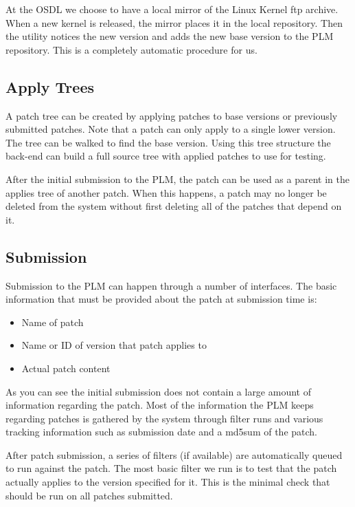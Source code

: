 At the OSDL we choose to have a local mirror of the Linux Kernel ftp archive.  
When a new kernel is released, the mirror places it in the local repository.  
Then the utility notices the new version and adds the new base version to 
the PLM repository.  This is a completely automatic procedure for us.

\subsection{Apply Trees}
A patch tree can be created by applying patches to base versions or previously
submitted patches.  Note that a patch can only apply to a single lower version.  
The tree can be walked to find the base version.  Using this tree structure the
back-end can build a full source tree with applied patches to use for testing.

After the initial submission to the PLM, the patch can be used as a parent
in the applies tree of another patch.  When this happens, a patch may no 
longer be deleted from the system without first deleting all of the patches 
that depend on it.

\subsection{Submission}
Submission to the PLM can happen through a number of interfaces.  The basic
information that must be provided about the patch at submission time is:

\begin{itemize}
\item Name of patch
\item Name or ID of version that patch applies to
\item Actual patch content
\end{itemize}

As you can see the initial submission does not contain a large amount of 
information regarding the patch.  Most of the information the PLM keeps 
regarding patches is gathered by the system through filter runs and various
tracking information such as submission date and a md5sum of the patch.

After patch submission, a series of filters (if available) are automatically 
queued to run against the patch.  The most basic filter we run is to test
that the patch actually applies to the version specified for it.  This 
is the minimal check that should be run on all patches submitted.


